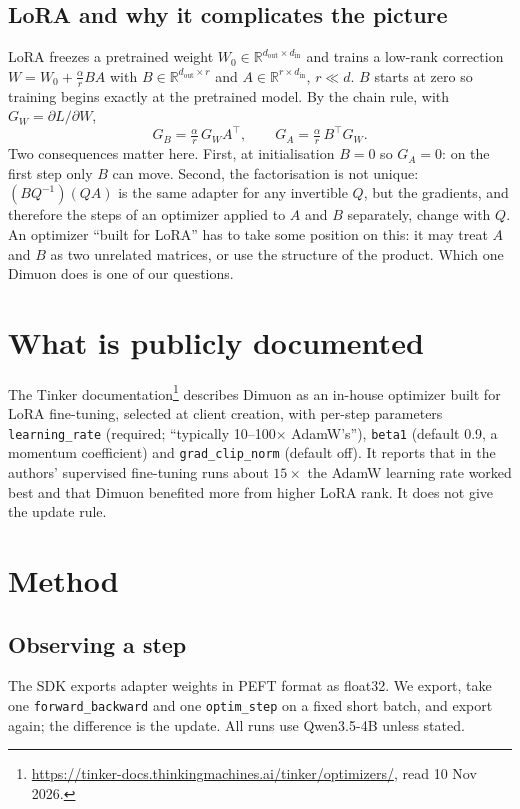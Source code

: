 \documentclass[11pt]{article}
\begin{document}
\subsection{LoRA and why it complicates the picture}
LoRA freezes a pretrained weight $W_0\in\mathbb{R}^{d_\text{out}\times d_\text{in}}$ and trains a
low-rank correction $W=W_0+\tfrac{\alpha}{r}BA$ with $B\in\mathbb{R}^{d_\text{out}\times r}$ and
$A\in\mathbb{R}^{r\times d_\text{in}}$, $r\ll d$. $B$ starts at zero so training begins exactly at
the pretrained model. By the chain rule, with $G_W=\partial L/\partial W$,
\[
G_B=\tfrac{\alpha}{r}\,G_W A^\top,\qquad G_A=\tfrac{\alpha}{r}\,B^\top G_W .
\]
Two consequences matter here. First, at initialisation $B=0$ so $G_A=0$: on the first step only
$B$ can move. Second, the factorisation is not unique: $(BQ^{-1})(QA)$ is the same adapter for any
invertible $Q$, but the gradients, and therefore the steps of an optimizer applied to $A$ and $B$
separately, change with $Q$. An optimizer ``built for LoRA'' has to take some position on this:
it may treat $A$ and $B$ as two unrelated matrices, or use the structure of the product. Which one
Dimuon does is one of our questions.

\section{What is publicly documented}
The Tinker documentation\footnote{\url{https://tinker-docs.thinkingmachines.ai/tinker/optimizers/},
read 10 Nov 2026.} describes Dimuon as an in-house optimizer built for LoRA fine-tuning, selected
at client creation, with per-step parameters \texttt{learning\_rate} (required; ``typically
10--100$\times$ AdamW's''), \texttt{beta1} (default 0.9, a momentum coefficient) and
\texttt{grad\_clip\_norm} (default off). It reports that in the authors' supervised fine-tuning
runs about $15\times$ the AdamW learning rate worked best and that Dimuon benefited more from
higher LoRA rank. It does not give the update rule.

\section{Method}
\subsection{Observing a step}
The SDK exports adapter weights in PEFT format as float32. We export, take one
\texttt{forward\_backward} and one \texttt{optim\_step} on a fixed short batch, and export again;
the difference is the update. All runs use Qwen3.5-4B unless stated.
\end{document}
